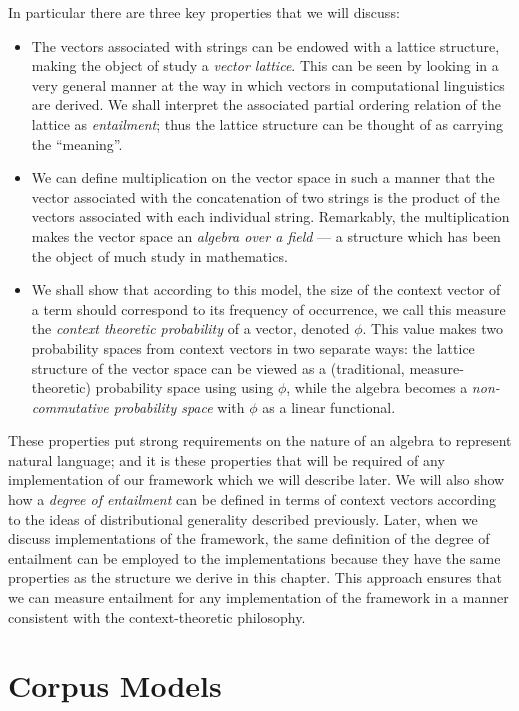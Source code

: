 In particular there are three key properties that we will discuss:
\begin{itemize}
\item The vectors associated with strings can be endowed with a lattice structure, making the object of study a \emph{vector lattice}. This can be seen by looking in a very general manner at the way in which vectors in computational linguistics are derived. We shall interpret the associated partial ordering relation of the lattice as \emph{entailment}; thus the lattice structure can be thought of as carrying the ``meaning''.
\item We can define multiplication on the vector space in such a manner that the vector associated with the concatenation of two strings is the product of the vectors associated with each individual string. Remarkably, the multiplication makes the vector space an \emph{algebra over a field} --- a structure which has been the object of much study in mathematics.
\item We shall show that according to this model, the size of the context vector of a term should correspond to its frequency of occurrence, we call this measure the \emph{context theoretic probability} of a vector, denoted $\phi$. This value makes two probability spaces from context vectors in two separate ways: the lattice structure of the vector space can be viewed as a (traditional, measure-theoretic) probability space using using $\phi$, while the algebra becomes a \emph{non-commutative probability space} with $\phi$ as a linear functional.
\end{itemize}
These properties put strong requirements on the nature of an algebra to represent natural language; and it is these properties that will be required of any implementation of our framework which we will describe later. We will also show how a \emph{degree of entailment} can be defined in terms of context vectors according to the ideas of distributional generality described previously. Later, when we discuss implementations of the framework, the same definition of the degree of entailment can be employed to the implementations because they have the same properties as the structure we derive in this chapter. This approach ensures that we can measure entailment for any implementation of the framework in a manner consistent with the context-theoretic philosophy.


\section{Corpus Models}

